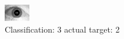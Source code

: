 \begin{figure}[h!]
\begin{center}
\includegraphics[width=0.60\columnwidth]{figures/ID1771_class_3_target_2.png}
\end{center}
\caption{ Classification: 3 actual target: 2}
\label{fig:ID1771_class_3_target_2}
\end{figure}

